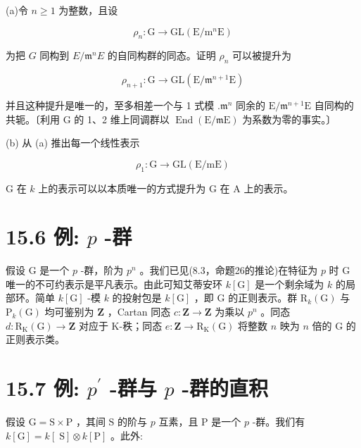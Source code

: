 \documentclass[10pt]{article}
\begin{document}
(a)令 \(n \geq  1\) 为整数，且设

\[
{\rho }_{n} : \mathrm{G} \rightarrow  \mathrm{{GL}}\left( {\mathrm{E}/{\mathrm{m}}^{n}\mathrm{E}}\right)
\]

为把 \(G\) 同构到 \(E/{\mathfrak{m}}^{n}E\) 的自同构群的同态。证明 \({\rho }_{n}\) 可以被提升为

\[
{\rho }_{n + 1} : \mathrm{G} \rightarrow  \mathrm{{GL}}\left( {\mathrm{E}/{\mathfrak{m}}^{n + 1}\mathrm{E}}\right)
\]

并且这种提升是唯一的，至多相差一个与 1 式模 \(.{\mathfrak{m}}^{n}\) 同余的 \(\mathrm{E}/{\mathfrak{m}}^{n + 1}\mathrm{E}\) 自同构的共轭。〔利用 \(\mathrm{G}\) 的 1、2 维上同调群以 \(\operatorname{End}\left( {\mathrm{E}/\mathfrak{m}\mathrm{E}}\right)\) 为系数为零的事实。〕

(b) 从 (a) 推出每一个线性表示

\[
{\rho }_{1} : \mathrm{G} \rightarrow  \mathrm{{GL}}\left( {\mathrm{E}/\mathrm{{mE}}}\right)
\]

G 在 \(k\) 上的表示可以以本质唯一的方式提升为 G 在 A 上的表示。

\section*{15.6 例: \(p\) -群}

假设 \(\mathrm{G}\) 是一个 \(p\) -群，阶为 \({p}^{n}\) 。我们已见(8.3，命题26的推论)在特征为 \(p\) 时 \(\mathrm{G}\) 唯一的不可约表示是平凡表示。由此可知艾蒂安环 \(k\left\lbrack  \mathrm{G}\right\rbrack\) 是一个剩余域为 \(k\) 的局部环。简单 \(k\left\lbrack  \mathrm{G}\right\rbrack\) -模 \(k\) 的投射包是 \(k\left\lbrack  \mathrm{G}\right\rbrack\) ，即 \(\mathrm{G}\) 的正则表示。群 \({\mathrm{R}}_{k}\left( \mathrm{G}\right)\) 与 \({\mathrm{P}}_{k}\left( \mathrm{G}\right)\) 均可鉴别为 \(\mathbf{Z}\) ，Cartan 同态 \(c : \mathbf{Z} \rightarrow  \mathbf{Z}\) 为乘以 \({p}^{n}\) 。同态 \(d : {\mathrm{R}}_{\mathrm{K}}\left( \mathrm{G}\right)  \rightarrow  \mathbf{Z}\) 对应于 K-秩；同态 \(e : \mathbf{Z} \rightarrow  {\mathrm{R}}_{\mathrm{K}}\left( \mathrm{G}\right)\) 将整数 \(n\) 映为 \(n\) 倍的 \(\mathrm{G}\) 的正则表示类。

\section*{15.7 例: \({p}^{\prime }\) -群与 \(p\) -群的直积}

假设 \(\mathrm{G} = \mathrm{S} \times  \mathrm{P}\) ，其间 \(\mathrm{S}\) 的阶与 \(p\) 互素，且 \(\mathrm{P}\) 是一个 \(p\) -群。我们有 \(k\left\lbrack  \mathrm{G}\right\rbrack   = k\left\lbrack  \mathrm{\;S}\right\rbrack   \otimes  k\left\lbrack  \mathrm{P}\right\rbrack\) 。此外:
\end{document}
